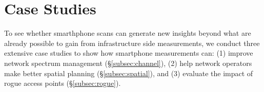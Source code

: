 \section{Case Studies}
\label{sec:case}

To see whether smarthphone scans can generate new insights beyond what are
already possible to gain from infrastructure side measurements, we conduct three
extensive case studies to show how smartphone measurements can: (1) improve network
spectrum management (\S\ref{subsec:channel}), (2) help network operators make better spatial
planning (\S\ref{subsec:spatial}), and (3) evaluate the impact of rogue access points
(\S\ref{subsec:rogue}).



%
